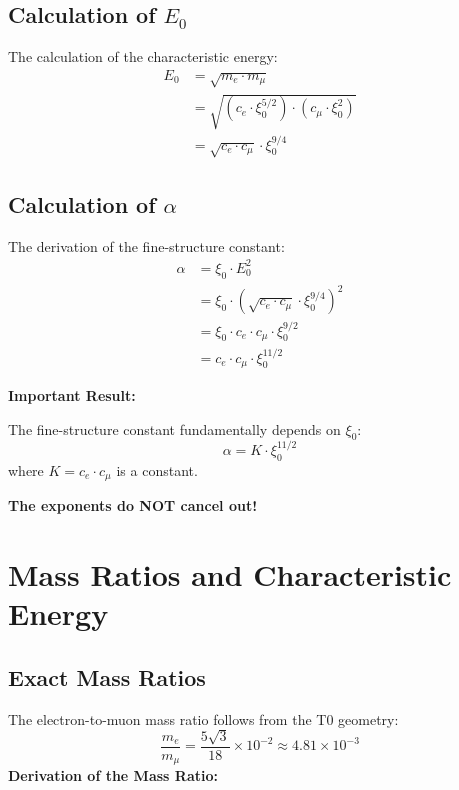 \documentclass[12pt,a4paper]{article}
\newcommand{\xipar}{\xi_0}
\newcommand{\Ezero}{E_0}
\begin{document}
	\subsection{Calculation of $\Ezero$}
	
	The calculation of the characteristic energy:
	\begin{align}
		\Ezero &= \sqrt{m_e \cdot m_\mu} \\
		&= \sqrt{(c_e \cdot \xipar^{5/2}) \cdot (c_\mu \cdot \xipar^2)} \\
		&= \sqrt{c_e \cdot c_\mu} \cdot \xipar^{9/4}
	\end{align}
	
	\subsection{Calculation of $\alpha$}
	
	The derivation of the fine-structure constant:
	\begin{align}
		\alpha &= \xipar \cdot \Ezero^2 \\
		&= \xipar \cdot (\sqrt{c_e \cdot c_\mu} \cdot \xipar^{9/4})^2 \\
		&= \xipar \cdot c_e \cdot c_\mu \cdot \xipar^{9/2} \\
		&= c_e \cdot c_\mu \cdot \xipar^{11/2}
	\end{align}
	
	\begin{warning}
		\textbf{Important Result:}
		
		The fine-structure constant fundamentally depends on $\xipar$:
		\begin{equation}
			\boxed{\alpha = K \cdot \xipar^{11/2}}
		\end{equation}
		where $K = c_e \cdot c_\mu$ is a constant.
		
		\textbf{The exponents do NOT cancel out!}
	\end{warning}
	
	\section{Mass Ratios and Characteristic Energy}
	
	\subsection{Exact Mass Ratios}
	
	The electron-to-muon mass ratio follows from the T0 geometry:
	\begin{equation}
		\frac{m_e}{m_\mu} = \frac{5\sqrt{3}}{18} \times 10^{-2} \approx 4.81 \times 10^{-3}
		\label{eq:mass_ratio}
	\end{equation}
	\textbf{Derivation of the Mass Ratio:}
	
\end{document}
